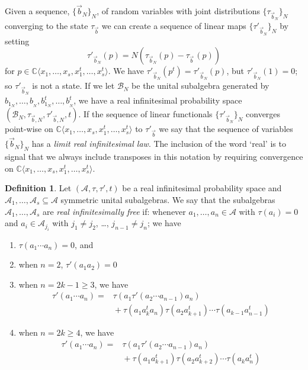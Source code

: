 \documentclass[11pt]{amsart}
\theoremstyle{definition}
\newtheorem{definition}[theorem]{Definition}
\numberwithin{theorem}{section}
\newcommand{\bC}{\mathbb{C}}
\newcommand{\cA}{\mathcal{A}}
\newcommand{\cB}{\mathcal{B}}
\newcommand{\sN}{{\scriptscriptstyle N}}
\begin{document}
Given a sequence, $\{\vec {b}_\sN\}_\sN$, of random
variables with joint distributions $\{ \tau_{\vec{b}_\sN}
\}_\sN$ converging to the state $\tau_{\vec b}$ we can
create a sequence of linear maps $\{ \tau'_{\vec{b}_\sN}
\}_\sN$ by setting
\[
\tau'_{\vec{b}_\sN}(p) = N( \tau_{\vec{b}_\sN}(p) - \tau_{\vec{b}\,}(p)) 
\]
for $p \in \bC\langle x_1, \dots, x_s, x_1^t, \dots,
x_s^t\rangle$. We have $\tau'_{\vec{b}_\sN}(p^t) =
\tau'_{\vec{b}_\sN}(p)$, but $\tau'_{\vec{b}_\sN}(1) = 0$;
so $\tau'_{\vec{b}_\sN}$ is not a state. If we let $\cB_\sN$
be the unital subalgebra generated by ${b}_{1_\sN}, \dots,
{b}_{_\sN}, {b}^t_{1_\sN}, \dots, {b}^t_{_\sN}$, we have a
real infinitesimal probability space $(\cB_\sN, \tau_{\vec
  b, \sN}, \tau'_{\vec b, \sN}, t)$. If the sequence of
linear functionals $\{\tau'_{\vec{b}_\sN}\}_\sN$ converges
point-wise on $\bC\langle x_1, \dots, x_s, x_1^t, \dots,
x_s^t\rangle$ to $\tau'_{\vec b}$ we say that the sequence
of variables $\{ \vec{b}_\sN\}_\sN$ has a \textit{limit real
  infinitesimal law}. The inclusion of the word `real' is to
signal that we always include transposes in this notation by
requiring convergence on $\bC\langle x_1, \dots, x_s, x_1^t,
\dots, x_s^t\rangle$.


\begin{definition}\label{def:real infinitesimal freeness}
Let $(\cA, \tau, \tau', t)$ be a real infinitesimal
probability space and $\cA_1, \dots, \cA_s \subseteq \cA$
symmetric unital subalgebras. We say that the subalgebras
$\cA_1, \dots, \cA_s$ are \textit{real infinitesimally free}
if: whenever $a_1, \dots, a_n \in \cA$ with $\tau(a_i) = 0$
and $a_i \in \cA_{j_i}$ with $j_1\not = j_2$, \dots,
$j_{n-1} \not= j_n$; we have

\begin{enumerate}
\item\smallskip
$\tau(a_1 \cdots a_n) = 0$, and

\item\smallskip
when $n = 2$, $\tau'(a_1 a_2) = 0$ 

\item\smallskip
when $n = 2k - 1 \geq 3$, we have
\begin{align*}
\tau'(a_1 \cdots a_n) =\mbox{}  & \tau(a_1\tau'(a_2 \cdots a_{n-1})a_n) \\
& \mbox{} +
\tau(a_1 a_k^t a_n) \tau(a_2 a_{k+1}^t) \cdots \tau(a_{k-1}a_{n-1}^t) 
\end{align*}

\item\smallskip
when $n = 2k \geq 4$, we have
\begin{align*}
\tau'(a_1 \cdots a_n) =\mbox{}  & \tau(a_1\tau'(a_2 \cdots a_{n-1})a_n) \\
& \mbox{} +
\tau(a_1 a_{k+1}^t) \tau(a_2 a_{k+2}^t) \cdots \tau(a_{k}a_{n}^t)
\end{align*}
\end{enumerate}
\end{definition}
\end{document}
